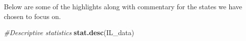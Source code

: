 \documentclass[
]{article}
\newenvironment{Shaded}{\begin{snugshade}}{\end{snugshade}}
\newcommand{\CommentTok}[1]{\textcolor[rgb]{0.56,0.35,0.01}{\textit{#1}}}
\newcommand{\KeywordTok}[1]{\textcolor[rgb]{0.13,0.29,0.53}{\textbf{#1}}}
\newcommand{\NormalTok}[1]{#1}
\newcommand{\OperatorTok}[1]{\textcolor[rgb]{0.81,0.36,0.00}{\textbf{#1}}}
\newcommand{\StringTok}[1]{\textcolor[rgb]{0.31,0.60,0.02}{#1}}
\begin{document}
Below are some of the highlights along with commentary for the states we
have chosen to focus on.

\begin{Shaded}
\end{Shaded}

\begin{Shaded}
\begin{Highlighting}[]
\CommentTok{#Descriptive statistics}
\KeywordTok{stat.desc}\NormalTok{(IL_data)}
\end{Highlighting}
\end{Shaded}
\end{document}
